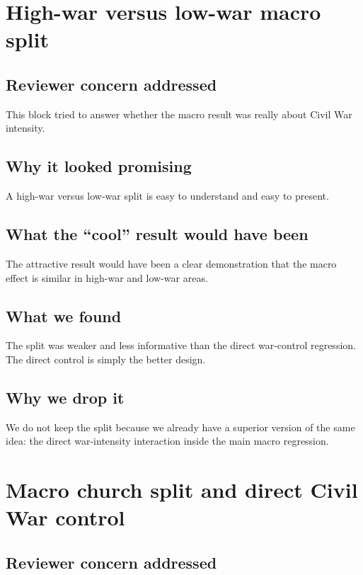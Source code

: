 \documentclass[11pt]{article}
\begin{document}
\section{High-war versus low-war macro split}

\subsection*{Reviewer concern addressed}

This block tried to answer whether the macro result was really about Civil War intensity.

\subsection*{Why it looked promising}

A high-war versus low-war split is easy to understand and easy to present.

\subsection*{What the ``cool'' result would have been}

The attractive result would have been a clear demonstration that the macro effect is similar in high-war and low-war areas.

\subsection*{What we found}

The split was weaker and less informative than the direct war-control regression. The direct control is simply the better design.

\subsection*{Why we drop it}

We do not keep the split because we already have a superior version of the same idea: the direct war-intensity interaction inside the main macro regression.

\section{Macro church split and direct Civil War control}

\subsection*{Reviewer concern addressed}
\end{document}
